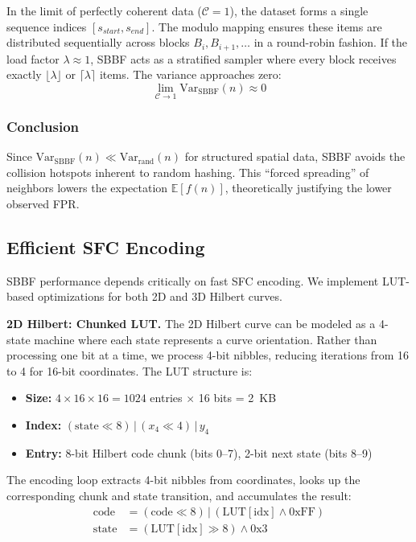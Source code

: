 \documentclass[conference,a4paper]{IEEEtran}
\begin{document}
In the limit of perfectly coherent data ($\mathcal{C}=1$), the dataset forms a single sequence indices $[s_{start}, s_{end}]$. The modulo mapping ensures these items are distributed sequentially across blocks $B_i, B_{i+1}, \dots$ in a round-robin fashion.
If the load factor $\lambda \approx 1$, SBBF acts as a stratified sampler where every block receives exactly $\lfloor \lambda \rfloor$ or $\lceil \lambda \rceil$ items. The variance approaches zero:
\begin{equation}
    \lim_{\mathcal{C} \to 1} \text{Var}_{\text{SBBF}}(n) \approx 0
\end{equation}

\subsubsection{Conclusion}
Since $\text{Var}_{\text{SBBF}}(n) \ll \text{Var}_{\text{rand}}(n)$ for structured spatial data, SBBF avoids the collision hotspots inherent to random hashing. This ``forced spreading'' of neighbors lowers the expectation $\mathbb{E}[f(n)]$, theoretically justifying the lower observed FPR.


\subsection{Efficient SFC Encoding}

SBBF performance depends critically on fast SFC encoding. We implement LUT-based optimizations for both 2D and 3D Hilbert curves.

\textbf{2D Hilbert: Chunked LUT.} The 2D Hilbert curve can be modeled as a 4-state machine where each state represents a curve orientation. Rather than processing one bit at a time, we process 4-bit nibbles, reducing iterations from 16 to 4 for 16-bit coordinates. The LUT structure is:
\begin{itemize}
    \item \textbf{Size:} $4 \times 16 \times 16 = 1024$ entries $\times$ 16 bits = 2~KB
    \item \textbf{Index:} $(\text{state} \ll 8) \,|\, (x_4 \ll 4) \,|\, y_4$
    \item \textbf{Entry:} 8-bit Hilbert code chunk (bits 0--7), 2-bit next state (bits 8--9)
\end{itemize}

The encoding loop extracts 4-bit nibbles from coordinates, looks up the corresponding chunk and state transition, and accumulates the result:
\begin{align}
    \text{code} &= (\text{code} \ll 8) \,|\, (\text{LUT}[\text{idx}] \land \text{0xFF}) \\
    \text{state} &= (\text{LUT}[\text{idx}] \gg 8) \land \text{0x3}
\end{align}
\end{document}
